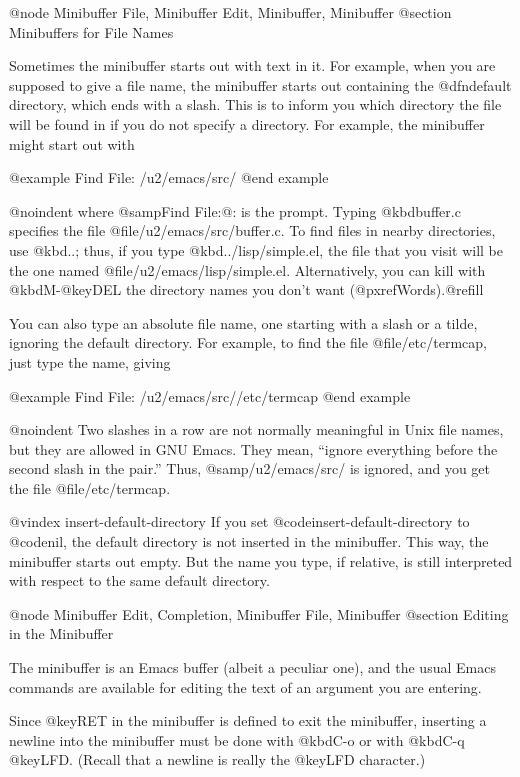 {{{{{@node Minibuffer File, Minibuffer Edit, Minibuffer, Minibuffer
@section Minibuffers for File Names

  Sometimes the minibuffer starts out with text in it.  For example, when
you are supposed to give a file name, the minibuffer starts out containing
the @dfn{default directory}, which ends with a slash.  This is to inform
you which directory the file will be found in if you do not specify a
directory.  For example, the minibuffer might start out with

@example
Find File: /u2/emacs/src/
@end example

@noindent
where @samp{Find File:@: } is the prompt.  Typing @kbd{buffer.c} specifies
the file @file{/u2/emacs/src/buffer.c}.  To find files in nearby
directories, use @kbd{..}; thus, if you type @kbd{../lisp/simple.el}, the
file that you visit will be the one named @file{/u2/emacs/lisp/simple.el}.
Alternatively, you can kill with @kbd{M-@key{DEL}} the directory names you
don't want (@pxref{Words}).@refill

  You can also type an absolute file name, one starting with a slash or a
tilde, ignoring the default directory.  For example, to find the file
@file{/etc/termcap}, just type the name, giving

@example
Find File: /u2/emacs/src//etc/termcap
@end example

@noindent
Two slashes in a row are not normally meaningful in Unix file names, but
they are allowed in GNU Emacs.  They mean, ``ignore everything before the
second slash in the pair.''  Thus, @samp{/u2/emacs/src/} is ignored, and
you get the file @file{/etc/termcap}.

@vindex insert-default-directory
  If you set @code{insert-default-directory} to @code{nil}, the default directory
is not inserted in the minibuffer.  This way, the minibuffer starts out
empty.  But the name you type, if relative, is still interpreted with
respect to the same default directory.

@node Minibuffer Edit, Completion, Minibuffer File, Minibuffer
@section Editing in the Minibuffer

  The minibuffer is an Emacs buffer (albeit a peculiar one), and the usual
Emacs commands are available for editing the text of an argument you are
entering.

  Since @key{RET} in the minibuffer is defined to exit the minibuffer,
inserting a newline into the minibuffer must be done with @kbd{C-o} or with
@kbd{C-q @key{LFD}}.  (Recall that a newline is really the @key{LFD}
character.)

}}}}}
